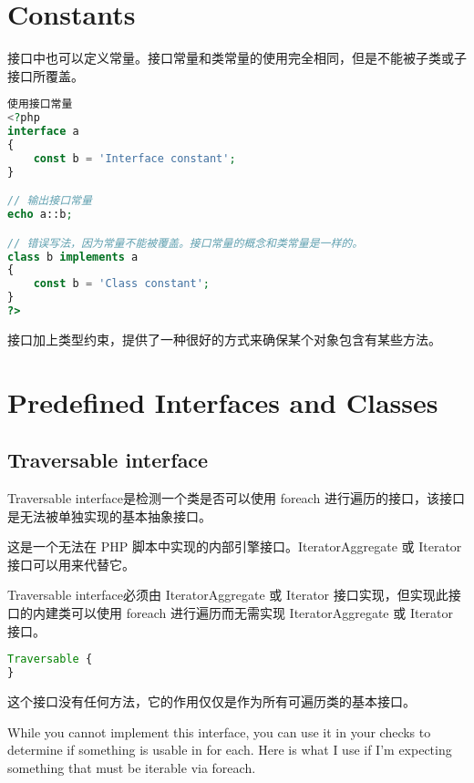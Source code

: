 \section{Constants}


接口中也可以定义常量。接口常量和类常量的使用完全相同，但是不能被子类或子接口所覆盖。







\begin{lstlisting}[language=PHP]
使用接口常量
<?php
interface a
{
    const b = 'Interface constant';
}

// 输出接口常量
echo a::b;

// 错误写法，因为常量不能被覆盖。接口常量的概念和类常量是一样的。
class b implements a
{
    const b = 'Class constant';
}
?>
\end{lstlisting}


接口加上类型约束，提供了一种很好的方式来确保某个对象包含有某些方法。


\section{Predefined Interfaces and Classes}



\subsection{Traversable interface}


Traversable interface是检测一个类是否可以使用 foreach 进行遍历的接口，该接口是无法被单独实现的基本抽象接口。

这是一个无法在 PHP 脚本中实现的内部引擎接口。IteratorAggregate 或 Iterator 接口可以用来代替它。


Traversable interface必须由 IteratorAggregate 或 Iterator 接口实现，但实现此接口的内建类可以使用 foreach 进行遍历而无需实现 IteratorAggregate 或 Iterator 接口。

\begin{lstlisting}[language=PHP]
Traversable {
}
\end{lstlisting}

这个接口没有任何方法，它的作用仅仅是作为所有可遍历类的基本接口。

While you cannot implement this interface, you can use it in your checks to determine if something is usable in for each. Here is what I use if I'm expecting something that must be iterable via foreach.




